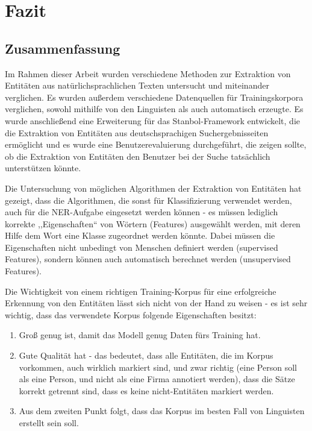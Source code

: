 \chapter{Fazit}

\section{Zusammenfassung}
Im Rahmen dieser Arbeit wurden verschiedene Methoden zur Extraktion von Entitäten aus natürlichsprachlichen Texten untersucht und miteinander verglichen. Es wurden außerdem verschiedene Datenquellen für Trainingskorpora verglichen, sowohl mithilfe von den Linguisten als auch automatisch erzeugte. Es wurde anschließend eine Erweiterung für das Stanbol-Framework entwickelt, die die Extraktion von Entitäten aus deutschsprachigen Suchergebnisseiten ermöglicht und es wurde eine Benutzerevaluierung durchgeführt, die zeigen sollte, ob die Extraktion von Entitäten den Benutzer bei der Suche tatsächlich unterstützen könnte. 

Die Untersuchung von möglichen Algorithmen der Extraktion von Entitäten hat gezeigt, dass die Algorithmen, die sonst für Klassifizierung verwendet werden, auch für die NER-Aufgabe eingesetzt werden können - es müssen lediglich korrekte ,,Eigenschaften`` von Wörtern (Features) ausgewählt werden, mit deren Hilfe dem Wort eine Klasse zugeordnet werden könnte. Dabei müssen die Eigenschaften nicht unbedingt von Menschen definiert werden (supervised Features), sondern können auch automatisch berechnet werden (unsupervised Features).

Die Wichtigkeit von einem richtigen Training-Korpus für eine erfolgreiche Erkennung von den Entitäten lässt sich nicht von der Hand zu weisen - es ist sehr wichtig, dass das verwendete Korpus folgende Eigenschaften besitzt:
\begin{enumerate}
\item Groß genug ist, damit das Modell genug Daten fürs Training hat.
\item Gute Qualität hat - das bedeutet, dass alle Entitäten, die im Korpus vorkommen, auch wirklich markiert sind, und zwar richtig (eine Person soll als eine Person, und nicht als eine Firma annotiert werden), dass die Sätze korrekt getrennt sind, dass es keine nicht-Entitäten markiert werden.
\item Aus dem zweiten Punkt folgt, dass das Korpus im besten Fall von Linguisten erstellt sein soll.
\end{enumerate}

